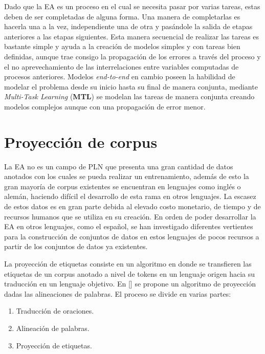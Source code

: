 Dado que la EA es un proceso en el cual se necesita pasar por varias tareas, estas deben de ser completadas
de alguna forma. Una manera de completarlas es hacerla una a la vez, independiente una de otra y pasándole
la salida de etapas anteriores a las etapas siguientes. Esta manera secuencial de realizar las 
tareas es bastante simple y ayuda a la creación de modelos simples y con tareas bien definidas, aunque trae consigo 
la propagación de los errores a través del proceso y el no aprevechamiento de las interrelaciones entre variables 
computadas de procesos anteriores. Modelos \emph{end-to-end} en cambio poseen la habilidad de modelar el problema 
desde su inicio hasta su final de manera conjunta, mediante \emph{Multi-Task Learning} (\textbf{MTL}) se modelan
las tareas de manera conjunta creando modelos complejos aunque con una propagación de error menor.

\section{Proyección de corpus}

La EA no es un campo de PLN que presenta una gran cantidad de datos anotados con los cuales se pueda realizar 
un entrenamiento, además de esto la gran mayoría de corpus existentes se encuentran en lenguajes como inglés o alemán,
haciendo difícil el desarrollo de esta rama en otros lenguajes.
La escasez de estos datos es en gran parte debida al elevado costo monetario, de tiempo y de recursos humanos que se utiliza
en su creación. En orden de poder desarrollar la EA en otros lenguajes, como el español, se han investigado diferentes vertientes
para la construcción de conjuntos de datos en estos lenguajes de pocos recursos a partir de los conjuntos de datos ya 
existentes.

La proyección de etiquetas consiste en un algoritmo en donde se 
transfieren las etiquetas de un corpus anotado a nivel de tokens en un lenguaje origen hacia su traducción en un 
lenguaje objetivo. En [\cite{eger2018cross}] se propone un algoritmo de proyección dadas las alineaciones de 
palabras. El proceso se divide en varias partes:

\begin{enumerate}
	\item Traducción de oraciones.
	\item Alineación de palabras.
	\item Proyección de etiquetas.
\end{enumerate}

